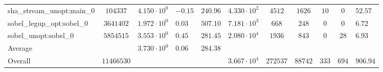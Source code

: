 \begin{tabular}{|l|c|HHc|c|c|c|c|cH|}
sha\_stream\_unopt:main\_0                      & $ 104337   $ & $ 4.150 \cdot 10^{0} $ & $ -0.15 $ & $ 240.96 $ & $ 4.330 \cdot 10^{2}  $ & $ 4512   $ & $ 1626  $ & $ 10  $ & $ 0   $ & $ 52.57   $ \\
sobel\_legup\_opt:sobel\_0                      & $ 3641402  $ & $ 1.972 \cdot 10^{0} $ & $ 0.03  $ & $ 507.10 $ & $ 7.181 \cdot 10^{3}  $ & $ 668    $ & $ 248   $ & $ 0   $ & $ 0   $ & $ 6.72    $ \\
sobel\_unopt:sobel\_0                           & $ 5854515  $ & $ 3.553 \cdot 10^{0} $ & $ 0.45  $ & $ 281.45 $ & $ 2.080 \cdot 10^{4}  $ & $ 1936   $ & $ 843   $ & $ 0   $ & $ 28  $ & $ 6.93    $ \\
\hline
Average                                         & $          $ & $ 3.730 \cdot 10^{0} $ & $ 0.06  $ & $ 284.38 $ & $                     $ & $        $ & $       $ & $     $ & $     $ & $         $ \\
\hline
Overall                                         & $ 11466530 $ & $                    $ & $       $ & $        $ & $ 3.667 \cdot 10^{4}  $ & $ 272537 $ & $ 88742 $ & $ 333 $ & $ 694 $ & $ 906.94  $ \\
\hline
\end{tabular}
